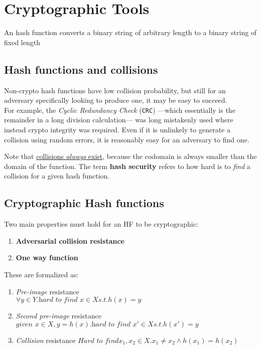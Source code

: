 \chapter{Cryptographic Tools}
\begin{definition}
   An hash function converts a binary string of arbitrary length to a binary string of fixed length
\end{definition}

\section{Hash functions and collisions}
Non-crypto hash functions have low collision probability, but still for an adversary specifically looking to produce one, it may be easy to succeed.\\
For example, the \textit{Cyclic Redundancy Check} (\texttt{CRC}) ---which essentially is the remainder in a long division calculation--- was long mistakenly used where instead crypto integrity was required.
Even if it is unlinkely to generate a collision using random errors, it is reasonably easy for an adversary to find one. 

Note that \ul{collisions \textit{always} exist}, because the codomain is always smaller than the domain of the function.
The term \textbf{hash security} refers to how hard is to \textit{find} a collision for a given hash function.


\section{Cryptographic Hash functions}
Two main properties must hold for an HF to be cryptographic:
\begin{enumerate}
   \item \textbf{Adversarial collision resistance}
   \item \textbf{One way function}
\end{enumerate}

These are formalized as:
\begin{enumerate}
   \item \textit{Pre-image} resistance\\
   $\forall y \in Y. \textit{hard to find } x \in X s.t. h(x) = y$
   \item \textit{Second pre-image} resistance
   $\textit{given } x \in X, y = h(x). \textit{hard to find } x' \in X s.t. h(x') = y$
   \item \textit{Collision} resistance
   $\textit{Hard to find} x_1,x_2 \in X. x_1 \neq x_2 \wedge h(x_1) = h(x_2)$
\end{enumerate}

